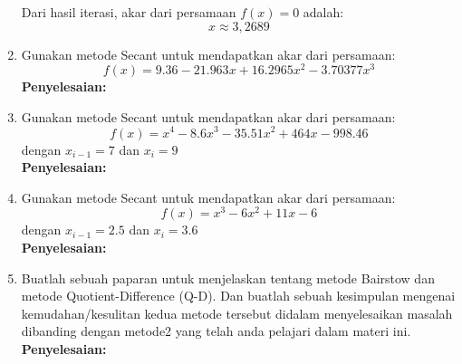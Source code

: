 \documentclass{article}
\newcommand{\penyelesaian}{\textbf{Penyelesaian: }}
\begin{document}
\begin{enumerate}
    Dari hasil iterasi, akar dari persamaan $f(x) = 0$ adalah:
    \begin{equation}
        x \approx 3,2689
    \end{equation}

    \item Gunakan metode Secant untuk mendapatkan akar dari persamaan:
    \begin{equation*}
        f(x) = \num{9,36} - \num{21,963}x + \num{16,2965}x^2 - \num{3,70377}x^3
    \end{equation*}
    \penyelesaian

    \item Gunakan metode Secant untuk mendapatkan akar dari persamaan:
    \begin{equation*}
        f(x) = x^4 - \num{8,6}x^3 - \num{35,51}x^2 + \num{464}x - \num{998,46}
    \end{equation*}
    dengan $x_{i-1} = \num{7}$ dan $x_i = \num{9}$ \\
    \penyelesaian

    \item Gunakan metode Secant untuk mendapatkan akar dari persamaan:
    \begin{equation*}
        f(x) = x^3 - \num{6}x^2 + \num{11}x - \num{6}
    \end{equation*}
    dengan $x_{i-1} = \num{2,5}$ dan $x_i = \num{3,6}$ \\
    \penyelesaian

    \item Buatlah sebuah paparan untuk menjelaskan tentang metode Bairstow dan metode Quotient-Difference (Q-D). 
    Dan buatlah sebuah kesimpulan mengenai kemudahan/kesulitan kedua metode tersebut didalam menyelesaikan masalah dibanding dengan metode2 yang telah anda pelajari dalam materi ini. \\
    \penyelesaian

\end{enumerate}
\end{document}
